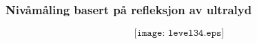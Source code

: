 \documentclass[aspectratio=169,xcolor=dvipsnames]{beamer}
\begin{document}
%
%
%
%
%
%
%
%
%
\begin{frame}
	\frametitle{Nivåmåling basert på refleksjon av ultralyd}

	$$\texttt{[image: level34.eps]}$$
\end{frame}
%
%
%
%
\end{document}
